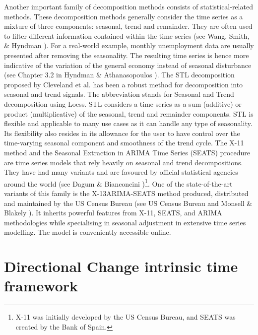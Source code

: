 Another important family of decomposition methods consists of statistical-related methods. These decomposition methods generally consider the time series as a mixture of three components: seasonal, trend and remainder. They are often used to filter different information contained within the time series (see Wang, Smith, \& Hyndman \citeyear{wang2006characteristic}). For a real-world example, monthly unemployment data are usually presented after removing the seasonality. The resulting time series is hence more indicative of the variation of the general economy instead of seasonal disturbance (see Chapter 3.2 in Hyndman \& Athanasopoulos \citeyear{forecastingprincipleandpractice}). The STL decomposition proposed by Cleveland et al. \citeyear{cleveland1990stl} has been a robust method for decomposition into seasonal and trend signals. The abbreviation stands for Seasonal and Trend decomposition using Loess. STL considers a time series as a sum (additive) or product (multiplicative) of the seasonal, trend and remainder components. STL is flexible and applicable to many use cases as it can handle any type of seasonality. Its flexibility also resides in its allowance for the user to have control over the time-varying seasonal component and smoothness of the trend cycle. The X-11 method and the Seasonal Extraction in ARIMA Time Series (SEATS) procedure are time series models that rely heavily on seasonal and trend decompositions. They have had many variants and are favoured by official statistical agencies around the world (see Dagum \& Bianconcini \citeyear{dagum2016seasonal})\footnote{X-11 was initially developed by the US Census Bureau, and SEATS was created by the Bank of Spain.}. One of the state-of-the-art variants of this family is the X-13ARIMA-SEATS method produced, distributed and maintained by the US Census Bureau (see US Census Bureau \citeyear{x13arimaseatsmanual} and Monsell \& Blakely \citeyear{monsell2013x}). It inherits powerful features from X-11, SEATS, and ARIMA methodologies while specialising in seasonal adjustment in extensive time series modelling. The model is conveniently accessible online\footnotemark{}.

\section{Directional Change intrinsic time framework}\label{sec: DC}

